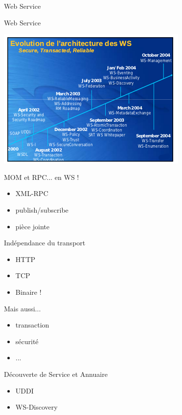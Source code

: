 {\begin{frame}{Web Service}
  \end{frame}

  \begin{frame}{Web Service}
    \begin{center}
      \includegraphics[scale=0.8]{img/ws-star.png}
    \end{center}
  \end{frame}

  \begin{frame}
    \begin{block}{MOM et RPC... en WS !}
      \begin{itemize}
        \item XML-RPC
        \item publish/subscribe
        \item pièce jointe
      \end{itemize}
    \end{block}

    \begin{block}{Indépendance du transport}
      \begin{itemize}
        \item HTTP
        \item TCP
        \item Binaire !
      \end{itemize}
    \end{block}
  \end{frame}

  \begin{frame}
    \begin{block}{Mais aussi...}
      \begin{itemize}
        \item transaction
        \item sécurité
        \item ...
      \end{itemize}
    \end{block}

    \begin{block}{Découverte de Service et Annuaire}
      \begin{itemize}
        \item UDDI
        \item WS-Discovery
      \end{itemize}
    \end{block}
  \end{frame}
}

